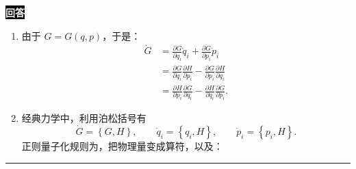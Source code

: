 \documentclass[11pt,a4paper]{ctexart}
\newenvironment{answer}
  {\par\smallskip\noindent
   \begingroup
   \setlength{\fboxsep}{4pt}%
   \colorbox{black}{\textcolor{white}{\bfseries 回答}}%
   \endgroup
   \quad\ignorespaces}
  {\par\smallskip\noindent\rule{\linewidth}{0.4pt}\medskip}
\begin{document}
\begin{answer}
\begin{enumerate}[label=(1.4.\arabic*),ref=1.4.\arabic*,leftmargin=4.5em]
\begin{equation}
\begin{aligned}
        &=p_i\mathrm{d}\dot{q}_i + \dot{q}_i\mathrm{d}p_i - \frac{\partial L }{\partial q_i }\mathrm{d}q_i - p_i \mathrm{d}\dot{q}_i \\
        &=-\frac{\partial L }{\partial q_i } \mathrm{d}q_i + \dot{q}_i \mathrm{d}p_i.
      \end{aligned}
    \end{equation}
    结合拉格朗日方程，有：
    \begin{equation}
      \begin{aligned}
        \mathrm{d}H
        &=-\frac{\mathrm{d} }{\mathrm{d}t } \left(\frac{\partial L }{\partial \dot{q}_i } \right) \mathrm{d}q_i + \dot{q}_i \mathrm{d}p_i \\
        &=-\dot{p}_i\mathrm{d}q_i + \dot{q}_i\mathrm{d}p_i,
      \end{aligned}
    \end{equation}
    由上式，可得哈密顿量对自变量的偏微分为：
    \begin{equation}
      \frac{\partial H}{\partial q_i } = -\dot{p}_i,\qquad
      \frac{\partial H }{\partial p_i } = \dot{q}_i, 
    \end{equation}
    也即
    \begin{equation}
      \dot q_i=\frac{\partial H}{\partial p_i},\qquad \dot p_i=-\frac{\partial H}{\partial q_i}.
    \end{equation}
    \item 由于 $G=G(q,p) $，于是：
    \begin{equation}
      \begin{aligned}
        \dot{G}
        &=\frac{\partial G }{\partial q_i }\dot{q}_i + \frac{\partial G }{\partial p_i }\dot{p}_i \\
        &=\frac{\partial G }{\partial q_i }\frac{\partial H }{\partial p_i } - \frac{\partial G }{\partial p_i }\frac{\partial H }{\partial q_i } \\
        &=\frac{\partial H}{\partial p_i}\frac{\partial G}{\partial q_i}-\frac{\partial H}{\partial q_i}\frac{\partial G}{\partial p_i}.   
      \end{aligned}
    \end{equation}
    \item 经典力学中，利用泊松括号有
    \begin{equation}
      \dot{G}
      =\left\{G,H \right\},\qquad
      \dot{q}_i
      =\left\{q_i,H \right\},\qquad
      \dot{p}_i
      =\left\{p_i,H \right\}.
    \end{equation}
    正则量子化规则为，把物理量变成算符，以及：

\end{enumerate}
\end{answer}
\end{document}
